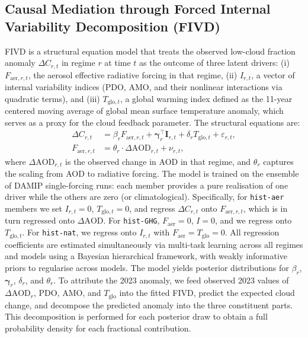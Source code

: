 \documentclass{article}
\begin{document}
\subsection{Causal Mediation through Forced Internal Variability Decomposition (FIVD)}

FIVD is a structural equation model that treats the observed low-cloud fraction anomaly $\Delta C_{r,t}$ in regime $r$ at time $t$ as the outcome of three latent drivers: (i) $F_{\mathrm{aer},r,t}$, the aerosol effective radiative forcing in that regime, (ii) $I_{r,t}$, a vector of internal variability indices (PDO, AMO, and their nonlinear interactions via quadratic terms), and (iii) $T_{\mathrm{glo},t}$, a global warming index defined as the 11-year centered moving average of global mean surface temperature anomaly, which serves as a proxy for the cloud feedback parameter. The structural equations are:
\begin{align}
\Delta C_{r,t} &= \beta_r F_{\mathrm{aer},r,t} + \boldsymbol{\gamma}_r^\top \mathbf{I}_{r,t} + \delta_r T_{\mathrm{glo},t} + \varepsilon_{r,t}, \\
F_{\mathrm{aer},r,t} &= \theta_r \cdot \Delta\mathrm{AOD}_{r,t} + \nu_{r,t},
\end{align}
where $\Delta\mathrm{AOD}_{r,t}$ is the observed change in AOD in that regime, and $\theta_r$ captures the scaling from AOD to radiative forcing. The model is trained on the ensemble of DAMIP single-forcing runs: each member provides a pure realisation of one driver while the others are zero (or climatological). Specifically, for \texttt{hist-aer} members we set $I_{r,t}=0$, $T_{\mathrm{glo},t}=0$, and regress $\Delta C_{r,t}$ onto $F_{\mathrm{aer},r,t}$, which is in turn regressed onto $\Delta\mathrm{AOD}$. For \texttt{hist-GHG}, $F_{\mathrm{aer}}=0$, $I=0$, and we regress onto $T_{\mathrm{glo},t}$. For \texttt{hist-nat}, we regress onto $I_{r,t}$ with $F_{\mathrm{aer}}=T_{\mathrm{glo}}=0$. All regression coefficients are estimated simultaneously via multi-task learning across all regimes and models using a Bayesian hierarchical framework, with weakly informative priors to regularise across models. The model yields posterior distributions for $\beta_r$, $\boldsymbol{\gamma}_r$, $\delta_r$, and $\theta_r$. To attribute the 2023 anomaly, we feed observed 2023 values of $\Delta\mathrm{AOD}_r$, PDO, AMO, and $T_{\mathrm{glo}}$ into the fitted FIVD, predict the expected cloud change, and decompose the predicted anomaly into the three constituent parts. This decomposition is performed for each posterior draw to obtain a full probability density for each fractional contribution.
\end{document}
